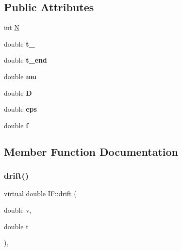 \subsection*{Public Attributes}
\begin{DoxyCompactItemize}
\item 
int \hyperlink{classIF_aa81bddacf949214f2265214d7174f4c2}{N}
\item 
\mbox{\label{classIF_ab9ff14c2b3690db446567d26cdf21540}} 
double {\bfseries t\+\_}
\item 
\mbox{\label{classIF_a2c512964adfc0421306b655ba3c85d3d}} 
double {\bfseries t\+\_\+end}
\item 
\mbox{\label{classIF_a9f690c993d7b7cd0095e26607503db72}} 
double {\bfseries mu}
\item 
\mbox{\label{classIF_a7e0fdbf32975dba0acf8096524885639}} 
double {\bfseries D}
\item 
\mbox{\label{classIF_aa91a852e6ea237c13679ecc65a9931d6}} 
double {\bfseries eps}
\item 
\mbox{\label{classIF_a26cf73a30be35c3e8a80e2a2f8e739f9}} 
double {\bfseries f}
\end{DoxyCompactItemize}


\subsection{Member Function Documentation}
\mbox{\label{classIF_a9bbd53df68cb9028bf87cf5273253e91}} 
\subsubsection{\texorpdfstring{drift()}{drift()}}
{\footnotesize\ttfamily virtual double I\+F\+::drift (\begin{DoxyParamCaption}\item[{double}]{v,  }\item[{double}]{t }\end{DoxyParamCaption})\hspace{0.3cm}{\ttfamily [inline]}, {\ttfamily [virtual]}}

